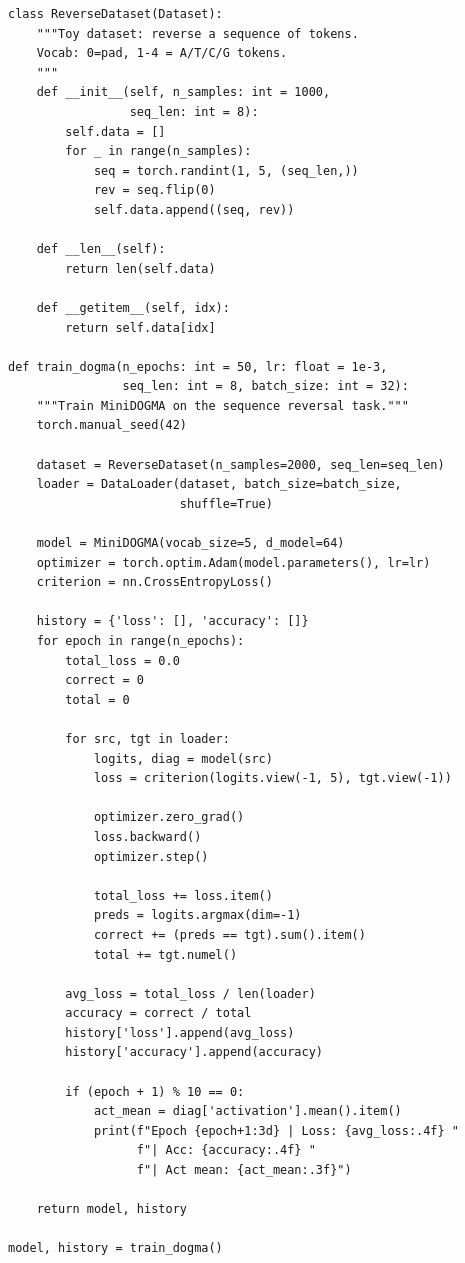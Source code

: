 \begin{lstlisting}[style=dogmapython, caption={Lab 6: Training on the sequence reversal task.}]
class ReverseDataset(Dataset):
    """Toy dataset: reverse a sequence of tokens.
    Vocab: 0=pad, 1-4 = A/T/C/G tokens.
    """
    def __init__(self, n_samples: int = 1000,
                 seq_len: int = 8):
        self.data = []
        for _ in range(n_samples):
            seq = torch.randint(1, 5, (seq_len,))
            rev = seq.flip(0)
            self.data.append((seq, rev))

    def __len__(self):
        return len(self.data)

    def __getitem__(self, idx):
        return self.data[idx]

def train_dogma(n_epochs: int = 50, lr: float = 1e-3,
                seq_len: int = 8, batch_size: int = 32):
    """Train MiniDOGMA on the sequence reversal task."""
    torch.manual_seed(42)

    dataset = ReverseDataset(n_samples=2000, seq_len=seq_len)
    loader = DataLoader(dataset, batch_size=batch_size,
                        shuffle=True)

    model = MiniDOGMA(vocab_size=5, d_model=64)
    optimizer = torch.optim.Adam(model.parameters(), lr=lr)
    criterion = nn.CrossEntropyLoss()

    history = {'loss': [], 'accuracy': []}
    for epoch in range(n_epochs):
        total_loss = 0.0
        correct = 0
        total = 0

        for src, tgt in loader:
            logits, diag = model(src)
            loss = criterion(logits.view(-1, 5), tgt.view(-1))

            optimizer.zero_grad()
            loss.backward()
            optimizer.step()

            total_loss += loss.item()
            preds = logits.argmax(dim=-1)
            correct += (preds == tgt).sum().item()
            total += tgt.numel()

        avg_loss = total_loss / len(loader)
        accuracy = correct / total
        history['loss'].append(avg_loss)
        history['accuracy'].append(accuracy)

        if (epoch + 1) % 10 == 0:
            act_mean = diag['activation'].mean().item()
            print(f"Epoch {epoch+1:3d} | Loss: {avg_loss:.4f} "
                  f"| Acc: {accuracy:.4f} "
                  f"| Act mean: {act_mean:.3f}")

    return model, history

model, history = train_dogma()
\end{lstlisting}

